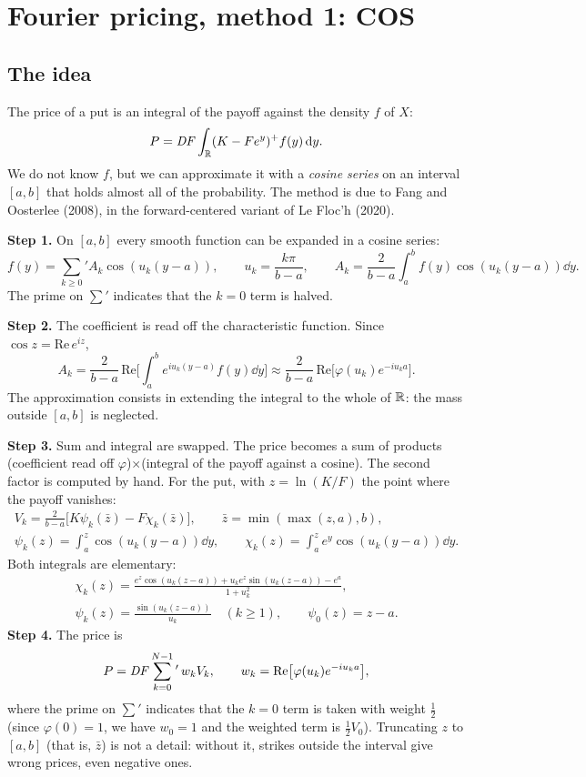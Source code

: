\section{Fourier pricing, method 1: COS}
\subsection{The idea}
The price of a put is an integral of the payoff against the density $f$ of $X$:
\[
P=\mathit{DF}\int_{\mathbb{R}}(K-Fe^y)^+f(y)\mathop{}\!\mathrm{d} y .
\]
We do not know $f$, but we can approximate it with a \emph{cosine series} on an interval $[a,b]$ that holds almost all
of the probability. The method is due to Fang and Oosterlee (2008), in the forward-centered variant of Le Floc'h
(2020).

\textbf{Step 1.} On $[a,b]$ every smooth function can be expanded in a cosine series:
\[
f(y)=\sum_{k\ge0}{}'A_k\cos(u_k(y-a)),\qquad u_k=\frac{k\pi}{b-a},
\qquad A_k=\frac2{b-a}\int_a^bf(y)\cos(u_k(y-a))\dd y .
\]
The prime on $\sum'$ indicates that the $k=0$ term is halved.

\textbf{Step 2.} The coefficient is read off the characteristic function. Since $\cos z=\mathrm{Re}\,e^{iz}$,
\[
A_k=\frac2{b-a}\,\mathrm{Re}\Big[\int_a^be^{iu_k(y-a)}f(y)\dd y\Big]
\approx\frac2{b-a}\,\mathrm{Re}\big[\varphi(u_k)e^{-iu_ka}\big].
\]
The approximation consists in extending the integral to the whole of $\mathbb{R}$: the mass outside $[a,b]$ is neglected.

\textbf{Step 3.} Sum and integral are swapped. The price becomes a sum of products (coefficient read off
$\varphi$)$\times$(integral of the payoff against a cosine). The second factor is computed by hand. For the put, with
$z=\ln(K/F)$ the point where the payoff vanishes:
\begin{gather*}
V_k=\frac2{b-a}\Big[K\psi_k(\bar z)-F\chi_k(\bar z)\Big],\qquad \bar z=\min(\max(z,a),b),\\
\psi_k(z)=\int_a^z\cos(u_k(y-a))\dd y,\qquad\chi_k(z)=\int_a^ze^y\cos(u_k(y-a))\dd y .
\end{gather*}
Both integrals are elementary:
\begin{gather*}
\chi_k(z)=\frac{e^{z}\cos(u_k(z-a))+u_ke^{z}\sin(u_k(z-a))-e^{a}}{1+u_k^2},\\
\psi_k(z)=\frac{\sin(u_k(z-a))}{u_k}\quad(k\ge1),\qquad\psi_0(z)=z-a .
\end{gather*}
\textbf{Step 4.} The price is
\begin{equation}\label{eq:cos}
P=\mathit{DF}\sum_{k=0}^{N-1}{}'\,w_kV_k,\qquad w_k=\mathrm{Re}\big[\varphi(u_k)e^{-iu_ka}\big],
\end{equation}
where the prime on $\sum'$ indicates that the $k=0$ term is taken with weight $\tfrac12$ (since $\varphi(0)=1$, we
have $w_0=1$ and the weighted term is $\tfrac12V_0$).
Truncating $z$ to $[a,b]$ (that is, $\bar z$) is not a detail: without it, strikes outside the interval give wrong
prices, even negative ones.

